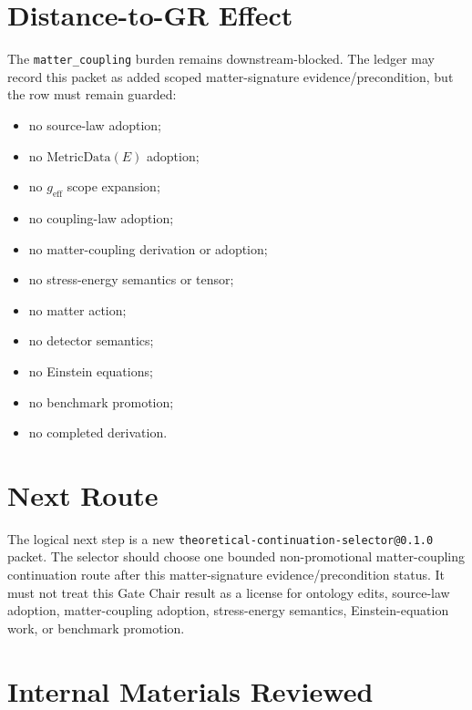 \documentclass[11pt]{article}
\newcommand{\MetricData}{\mathrm{MetricData}}
\newcommand{\geff}{g_{\mathrm{eff}}}
\begin{document}
\section{Distance-to-GR Effect}

The \texttt{matter\_coupling} burden remains downstream-blocked. The ledger may
record this packet as added scoped matter-signature evidence/precondition, but
the row must remain guarded:

\begin{itemize}
  \item no source-law adoption;
  \item no \(\MetricData(E)\) adoption;
  \item no \(\geff\) scope expansion;
  \item no coupling-law adoption;
  \item no matter-coupling derivation or adoption;
  \item no stress-energy semantics or tensor;
  \item no matter action;
  \item no detector semantics;
  \item no Einstein equations;
  \item no benchmark promotion;
  \item no completed derivation.
\end{itemize}

\section{Next Route}

The logical next step is a new \texttt{theoretical-continuation-selector@0.1.0}
packet. The selector should choose one bounded non-promotional
matter-coupling continuation route after this matter-signature
evidence/precondition status. It must not treat this Gate Chair result as a
license for ontology edits, source-law adoption, matter-coupling adoption,
stress-energy semantics, Einstein-equation work, or benchmark promotion.

\section{Internal Materials Reviewed}
\end{document}
